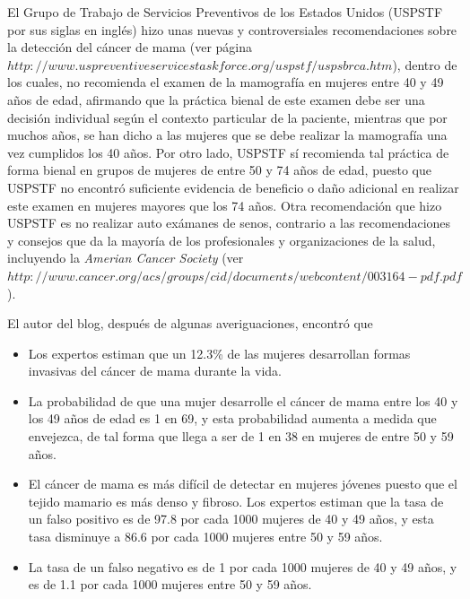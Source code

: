 \begin{Eje}
El Grupo de Trabajo de Servicios Preventivos de los Estados Unidos (USPSTF por sus siglas en inglés) hizo unas nuevas y controversiales recomendaciones sobre la detección del cáncer de mama (ver página $http://www.uspreventiveservicestaskforce.org/uspstf/uspsbrca.htm$), dentro de los cuales, no recomienda el examen de la mamografía en mujeres entre 40 y 49 años de edad, afirmando que la práctica bienal de este examen debe ser una decisión individual según el contexto particular de la paciente, mientras que por muchos años, se han dicho a las mujeres que se debe realizar la mamografía una vez cumplidos los 40 años. Por otro lado, USPSTF sí recomienda tal práctica de forma bienal en grupos de mujeres de entre 50 y 74 años de edad, puesto que USPSTF no encontró suficiente evidencia de beneficio o daño adicional en realizar este examen en mujeres mayores que los 74 años. Otra recomendación que hizo USPSTF es no realizar auto exámanes de senos, contrario a las recomendaciones y consejos que da la mayoría de los profesionales y organizaciones de la salud, incluyendo la \emph{Amerian Cancer Society} (ver $http://www.cancer.org/acs/groups/cid/documents/webcontent/003164-pdf.pdf$).

El autor del blog, después de algunas averiguaciones, encontró que 
\begin{itemize}
    \item Los expertos estiman que un 12.3\% de las mujeres desarrollan formas invasivas del cáncer de mama durante la vida.
    \item La probabilidad de que una mujer desarrolle el cáncer de mama entre los 40 y los 49 años de edad es 1 en 69, y esta probabilidad aumenta a medida que envejezca, de tal forma que llega a ser de 1 en 38 en mujeres de entre 50 y 59 años.
    \item El cáncer de mama es más difícil de detectar en mujeres jóvenes puesto que el tejido mamario es más denso y fibroso. Los expertos estiman que la tasa de un falso positivo es de 97.8 por cada 1000 mujeres de 40 y 49 años, y esta tasa disminuye a 86.6 por cada 1000 mujeres entre 50 y 59 años. 
    \item La tasa de un falso negativo es de 1 por cada 1000 mujeres de 40 y 49 años, y es de 1.1 por cada 1000 mujeres entre 50 y 59 años.
\end{itemize}


\end{Eje}
